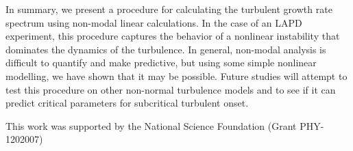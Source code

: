 \documentclass[letter,scriptaddress,twocolumn, prl,showkeys]{revtex4}
\begin{document}
In summary, we present a procedure for calculating the turbulent growth rate spectrum using non-modal linear calculations. 
In the case of an LAPD experiment, this procedure captures the behavior of a nonlinear instability that dominates the dynamics of the turbulence.  In general,
non-modal analysis is difficult to quantify and make predictive, but using some simple nonlinear modelling, we have shown
that it may be possible. Future studies will attempt to test this procedure on other non-normal turbulence models and to see if it can predict critical parameters for subcritical turbulent onset.

This work was supported by the National Science Foundation (Grant PHY-1202007)




\end{document}
